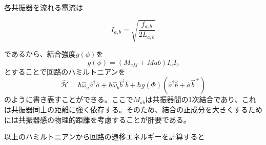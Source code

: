 各共振器を流れる電流は

\begin{equation}
    I_{a,b} = \sqrt{\frac{f_{a,b}}{2 L_{a,b}}}
\end{equation}

であるから、結合強度$g(\phi)$を
\begin{equation}
    g(\phi) = (M_{eff}+M{ab})I_a I_b
\end{equation}
とすることで回路のハミルトニアンを
\begin{equation}
    \hat{\mathcal{H}} = \hbar \hat{\omega}_{a} \hat{a}^{\dagger} \hat{a}+\hbar \hat{\omega}_{b} \hat{b}^{\dagger} \hat{b}+\hbar g(\Phi)\left(\hat{a}^{\dagger}\hat{b}+\hat{a} \vec{b}^{+}\right)
\end{equation}
のように書き表すことができる。ここで$M_{ab}$は共振器間の1次結合であり、これは共振器同士の距離に強く依存する。そのため、結合の正成分を大きくするためには共振器感の物理的距離を考慮することが肝要である。

以上のハミルトニアンから回路の遷移エネルギーを計算すると

